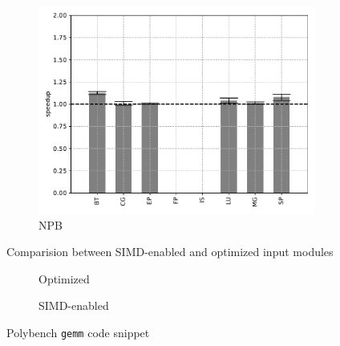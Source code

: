 \begin{figure}
\begin{subfigure}[t]{.45\textwidth}
        \includegraphics[width=\textwidth]{Images/6.3.RQ3/npb-simd-speedup}
        \caption{NPB}
    \end{subfigure}
    \caption{Comparision between SIMD-enabled and optimized input modules}
    \label{fig:rq3}
\end{figure}

\begin{figure}
    \centering
    \begin{subfigure}{\textwidth}
        
        \caption{Optimized}
        \label{fig:polybench-gemm-opt-code}
    \end{subfigure}
    \begin{subfigure}{\textwidth}
        
        \caption{SIMD-enabled}
        \label{fig:polybench-gemm-simd-code}
    \end{subfigure}
    \caption{Polybench \texttt{gemm} code snippet}
\end{figure}

